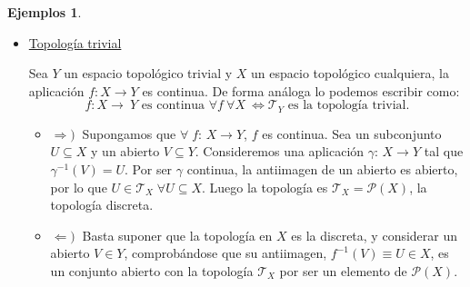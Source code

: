 \documentclass[12pt,twoside]{report}
\newcommand\mc[1]{\mathcal{#1}}
\theoremstyle{azul}
\theoremstyle{azul2}
\theoremstyle{plain}
\theoremstyle{definition}
\newtheorem*{ejes}{Ejemplos}
\theoremstyle{remark}
\begin{document}
\begin{ejes}
\begin{itemize}
\begin{itemize}
\item $\Leftarrow)\:$ Supongamos que $Y$ tiene la topología trivial, es decir, $\mc{T}_Y = \{\emptyset, Y\}$. Siendo $X$ un espacio topológico cualquiera y dada $f:\,X {\longrightarrow} \: Y$, se tiene que $f^{-1}(Y) = X$ y $f^{-1}(\emptyset) = \emptyset$ (todos los elementos de $X$ tienen imagen), con lo que toda $f$ es continua.
    \end{itemize}
      \newpage \textcolor{red}{REPASAR LAS DEMOSTRACIONES ANTERIOR Y POSTERIOR}
    \item \underline{Topología trivial}
    
    Sea $Y$ un espacio topológico trivial y $X$ un espacio topológico cualquiera, la aplicación $f:X {\longrightarrow} Y$ es continua. De forma análoga lo podemos escribir como:
    $$f:X {\longrightarrow}\: Y \text{ es continua } \forall f \: \forall X \: \Longleftrightarrow \mc{T}_Y \text{ es la topología trivial.}$$
    \begin{itemize}
        
\item $\Rightarrow)\:$ Supongamos que $\forall \; f:\,X\longrightarrow Y$, $f$ es continua. Sea un subconjunto $U \subseteq X$ y un abierto $V \subseteq Y$. Consideremos una aplicación $\gamma:\,X \longrightarrow Y$ tal que $\gamma^{-1}(V) = U$. Por ser $\gamma$ continua, la antiimagen de un abierto es abierto, por lo que $U \in \mc{T}_X \;\forall U \subseteq X$. Luego la topología es $\mc{T}_X = \mc{P}(X)$, la topología discreta.
    
\item $\Leftarrow)\:$ Basta suponer que la topología en $X$ es la discreta, y considerar un abierto $V \in Y$, comprobándose que su antiimagen, $f^{-1}(V) \equiv U \in X$, es un conjunto abierto con la topología $\mc{T}_X$ por ser un elemento de $\mc{P}(X)$.
    \end{itemize}
\end{itemize}
\end{ejes}
\end{document}
